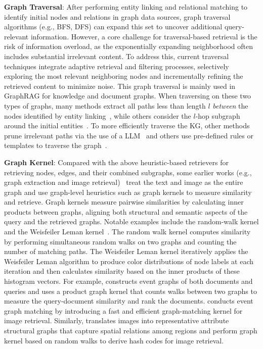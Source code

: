 \textbf{Graph Traversal}:
After performing entity linking and relational matching to identify initial nodes and relations in graph data sources, graph traversal algorithms (e.g., BFS, DFS) can expand this set to uncover additional query-relevant information. However, a core challenge for traversal-based retrieval is the risk of information overload, as the exponentially expanding neighborhood often includes substantial irrelevant content. To address this, current traversal techniques integrate adaptive retrieval and filtering processes, selectively exploring the most relevant neighboring nodes and incrementally refining the retrieved content to minimize noise. This graph traversal is mainly used in GraphRAG for knowledge and document graphs. When traversing on these two types of graphs, many methods extract all paths less than length $l$ {\it between} the nodes identified by entity linking~\cite{yasunaga2021qa, yasunaga2022deep, zhanggreaselm, jiang2024hykge, feng2020scalable}, while others consider the $l$-hop subgraph around the initial entities~\cite{niu2024mitigating, tian2024graph, jiang2023structgpt, kim2024causal}. To more efficiently traverse the KG, other methods prune irrelevant paths via the use of a LLM~\cite{luoreasoning, sanmartin2024kg, wang2024knowledge, knowledgenavigator} and others use pre-defined rules or templates to traverse the graph~\cite{keqing, liao2024gentkg, dai2024counter}.

\textbf{Graph Kernel}:
Compared with the above heuristic-based retrievers for retrieving nodes, edges, and their combined subgraphs, some earlier works (e.g., graph extraction and image retrieval)~\cite{wu2016gksh, lebrun2008image, glavavs2013event} treat the text and image as the entire graph and use graph-level heuristics such as graph kernels to measure similarity and retrieve. Graph kernels measure pairwise similarities by calculating inner products between graphs, aligning both structural and semantic aspects of the query and the retrieved graphs. Notable examples include the random-walk kernel and the Weisfeiler Leman kernel~\cite{shervashidze2011weisfeiler, vishwanathan2010graph}. The random walk kernel computes similarity by performing simultaneous random walks on two graphs and counting the number of matching paths. The 
Weisfeiler Leman kernel iteratively applies the Weisfeiler Leman algorithm to produce color distributions of node labels at each iteration and then calculates similarity based on the inner products of these histogram vectors. For example, \citet{wu2016gksh} constructs event graphs of both documents and queries and uses a product graph kernel that counts walks between two graphs to measure the query-document similarity and rank the documents. \citet{lebrun2008image} conducts event graph matching by introducing a fast and efficient graph-matching kernel for image retrieval. Similarly, \citet{glavavs2013event} translates images into representative attribute structural graphs that capture spatial relations among regions and perform graph kernel based on random walks to derive hash codes for image retrieval. 



